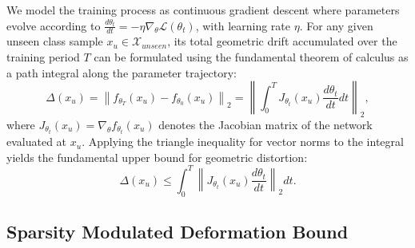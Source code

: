 \documentclass{article}
\begin{document}
We model the training process as continuous gradient descent where parameters evolve according to $\frac{d\theta_t}{dt} = -\eta \nabla_{\theta} \mathcal{L}(\theta_t)$, with learning rate $\eta$.
For any given unseen class sample $x_u \in \mathcal{X}_{unseen}$, its total geometric drift accumulated over the training period $T$ can be formulated using the fundamental theorem of calculus as a path integral along the parameter trajectory:
\begin{equation}
	\Delta(x_u) = \left\| f_{\theta_T}(x_u) - f_{\theta_0}(x_u) \right\|_2 = \left\| \int_{0}^{T}
	J_{\theta_t}(x_u) \frac{d\theta_t}{dt} dt \right\|_2, \end{equation} where $J_{\theta_t}(x_u) = \nabla_\theta f_{\theta_t}(x_u)$ denotes the Jacobian matrix of the network evaluated at $x_u$.
Applying the triangle inequality for vector norms to the integral yields the fundamental upper bound for geometric distortion:
\begin{equation}
	\Delta(x_u) \leq \int_{0}^{T} \left\| J_{\theta_t}(x_u) \frac{d\theta_t}{dt} \right\|_2 dt.
\end{equation}

\subsection{Sparsity Modulated Deformation Bound}
\end{document}
